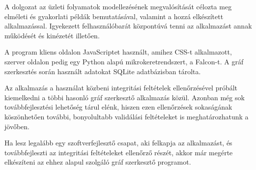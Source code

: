 
A dolgozat az üzleti folyamatok modellezésének megvalósítását célozta meg elméleti és gyakorlati példák bemutatásával, valamint a hozzá elkészített alkalmazással. Igyekezett felhasználóbarát központúvá tenni az alkalmazást annak működését és kinézetét illetően.

A program kliens oldalon JavaScriptet használt, amihez CSS-t alkalmazott, szerver oldalon pedig egy Python alapú mikrokeretrendszert, a Falcon-t. A gráf szerkesztés során használt adatokat SQLite adatbázisban tárolta.

Az alkalmazás a használat közbeni integritási feltételek ellenőrzésével próbált kiemelkedni a többi hasonló gráf szerkesztő alkalmazás közül. Azonban még sok továbbfejlesztési lehetőség tárul elénk, hiszen ezen ellenőrzések sokaságának köszönhetően további, bonyolultabb validálási feltételeket is meghatározhatunk a jövőben.

Ha lesz legalább egy szoftverfejlesztő csapat, aki felkapja az alkalmazást, és továbbfejleszti az integritási feltételeket ellenőrző részét, akkor már megérte elkészíteni az ehhez alapul szolgáló gráf szerkesztő programot.